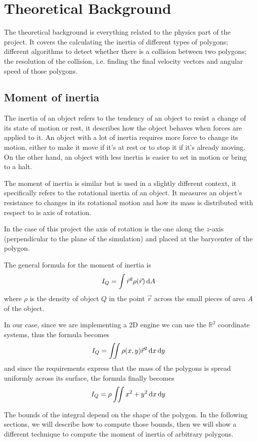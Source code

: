 \section{Theoretical Background}
The theoretical background is everything related to the physics part of the
project. It covers the calculating the inertia of different types of polygons;
different algorithms to detect whether there is a collision between two
polygons; the resolution of the collision, i.e. finding the final
velocity vectors and angular speed of those polygons.

\subsection{Moment of inertia}

The inertia of an object refers to the tendency of an object to resist a change
of its state of motion or rest, it describes how the object behaves when forces
are applied to it. An object with a lot of inertia requires more force to change
its motion, either to make it move if it's at rest or to stop it if it's already
moving. On the other hand, an object with less inertia is easier to set in
motion or bring to a halt.

The moment of inertia is similar but is used in a slightly different context, it
specifically refers to the rotational inertia of an object. It measures an
object's resistance to changes in its rotational motion and how its mass is
distributed with respect to is axis of rotation.

In the case of this project the axis of rotation is the one along the $z$-axis
(perpendicular to the plane of the simulation) and placed at the barycenter of
the polygon.

The general formula for the moment of inertia is
$$ I_Q = \int \vec r^2 \rho(\vec r) \mathop{}\!\mathrm{d} A $$
where $\rho$ is the density of object $Q$ in the point $\vec r$ across the
small pieces of area $A$ of the object.

In our case, since we are implementing a 2D engine we can use the $\mathbb{R}^2$
coordinate systems, thus the formula becomes
$$ I_Q = \iint \rho(x, y) \vec r^2 \mathop{}\!\mathrm{d} x\mathop{}\!\mathrm{d} y$$
and since the requirements express that the mass of the polygons is spread
uniformly across its surface, the formula finally becomes
\begin{equation}
	\label{eq:moment}
	I_Q = \rho \iint x^2 + y^2 \mathop{}\!\mathrm{d} x\mathop{}\!\mathrm{d} y
\end{equation}

The bounds of the integral depend on the shape of the polygon. In the following
sections, we will describe how to compute those bounds, then we will show a
different technique to compute the moment of inertia of arbitrary polygons.

